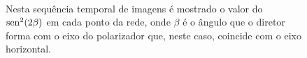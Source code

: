 \begin{figure}[!htb]
		\\
  \caption{Nesta sequência temporal de imagens é mostrado o valor
do ${\rm sen}^2(2\beta)$ em cada ponto da rede, onde $\beta$ é o ângulo
que o diretor forma com o eixo do polarizador que, neste caso, coincide
com o eixo horizontal.}
  \label{figura-2}
\end{figure}
